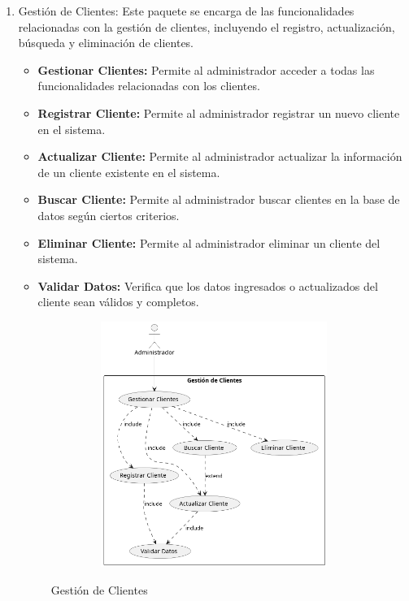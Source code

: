 \begin{enumerate}
	\item Gestión de Clientes: Este paquete se encarga de las funcionalidades relacionadas con la gestión de clientes, incluyendo el registro, actualización, búsqueda y eliminación de clientes.
	\begin{itemize}
		\item \textbf{Gestionar Clientes:} Permite al administrador acceder a todas las funcionalidades relacionadas con los clientes.
		\item \textbf{Registrar Cliente:} Permite al administrador registrar un nuevo cliente en el sistema.
		\item \textbf{Actualizar Cliente:} Permite al administrador actualizar la información de un cliente existente en el sistema.
		\item \textbf{Buscar Cliente:} Permite al administrador buscar clientes en la base de datos según ciertos criterios.
		\item \textbf{Eliminar Cliente:} Permite al administrador eliminar un cliente del sistema.
		\item \textbf{Validar Datos:} Verifica que los datos ingresados o actualizados del cliente sean válidos y completos.
	\end{itemize}
	\begin{figure}[H]
		\centering
		\caption{Gestión de Clientes}
		\includegraphics[width=12cm, height=8cm]{imagenes/cap4/casosUso/GestionClientes.png}
		\label{fig:Caso1}
	\end{figure}
	

\end{enumerate}

